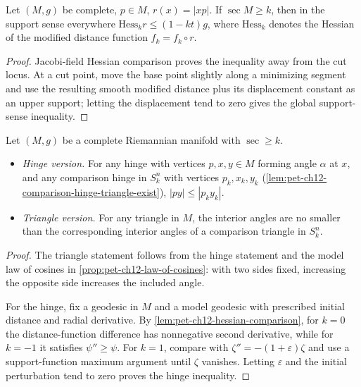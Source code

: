 \begin{lemma}
  \label{lem:pet-ch12-hessian-comparison}

  Let $(M,g)$ be complete, $p\in M$, $r(x)=|xp|$. If $\sec M\ge k$, then in the
  support sense everywhere $\mathrm{Hess}_kr\le(1-kt)g$, where $\mathrm{Hess}_k$
  denotes the Hessian of the modified distance function $f_k=f_k\circ r$.
\end{lemma}
\begin{proof}
  \sketch
  Jacobi-field Hessian comparison proves the inequality away from the cut
  locus. At a cut point, move the base point slightly along a minimizing
  segment and use the resulting smooth modified distance plus its displacement
  constant as an upper support; letting the displacement tend to zero gives
  the global support-sense inequality.
\end{proof}

\begin{theorem}
  \label{thm:pet-ch12-toponogov}

  Let $(M,g)$ be a complete Riemannian manifold with $\sec\ge k$.
  \begin{itemize}
    \item \emph{Hinge version.} For any hinge with vertices $p,x,y\in M$ forming
      angle $\alpha$ at $x$, and any comparison hinge in $S_k^n$ with vertices
      $p_k,x_k,y_k$ (\cref{lem:pet-ch12-comparison-hinge-triangle-exist}),
      $|py|\le|p_ky_k|$.
    \item \emph{Triangle version.} For any triangle in $M$, the interior angles
      are no smaller than the corresponding interior angles of a comparison
      triangle in $S_k^n$.
  \end{itemize}
\end{theorem}
\begin{proof}
  \sketch
  The triangle statement follows from the hinge statement and the model law of
  cosines in \cref{prop:pet-ch12-law-of-cosines}: with two sides fixed,
  increasing the opposite side increases the
  included angle.

  For the hinge, fix a geodesic in $M$ and a model geodesic with prescribed
  initial distance and radial derivative. By
  \cref{lem:pet-ch12-hessian-comparison}, for
  $k=0$ the distance-function difference has nonnegative second derivative,
  while for $k=-1$ it satisfies $\psi''\ge\psi$. For $k=1$, compare with
  $\zeta''=-(1+\varepsilon)\zeta$ and use a support-function maximum argument
  until $\zeta$ vanishes. Letting $\varepsilon$ and the initial perturbation
  tend to zero proves the hinge inequality.
\end{proof}

